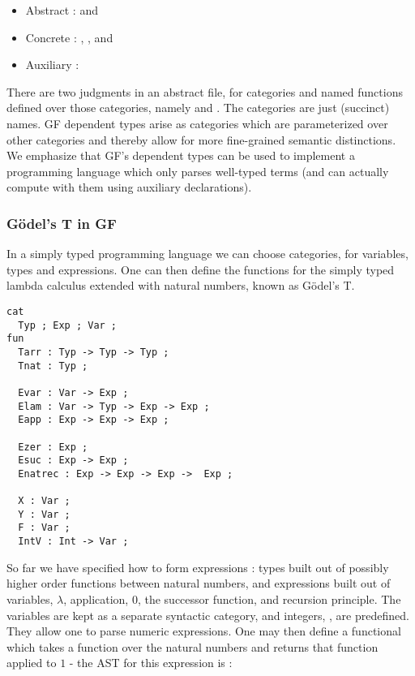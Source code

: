 \begin{itemize}[noitemsep]
  \item Abstract :  and 
  \item Concrete : , , and 
  \item Auxiliary : 
\end{itemize}

There are two judgments in an abstract file, for categories and named functions
defined over those categories, namely  and . The categories
are just (succinct) names. GF dependent types arise as categories which are
parameterized over other categories and thereby allow for more fine-grained
semantic distinctions. We emphasize that GF's dependent types can be used to
implement a programming language which only parses well-typed terms (and can
actually compute with them using auxiliary declarations).

\subsubsection{Gödel's T in GF}

In a simply typed programming language we can choose categories, for variables,
types and expressions. One can then define the functions for the simply typed
lambda calculus extended with natural numbers, known as Gödel's T.

\begin{verbatim} 
cat
  Typ ; Exp ; Var ;
fun
  Tarr : Typ -> Typ -> Typ ;
  Tnat : Typ ;

  Evar : Var -> Exp ;
  Elam : Var -> Typ -> Exp -> Exp ;
  Eapp : Exp -> Exp -> Exp ;

  Ezer : Exp ;
  Esuc : Exp -> Exp ;
  Enatrec : Exp -> Exp -> Exp ->  Exp ;

  X : Var ;
  Y : Var ;
  F : Var ;
  IntV : Int -> Var ;
\end{verbatim}

So far we have specified how to form expressions : types built out of possibly
higher order functions between natural numbers, and expressions built out of
variables, $\lambda$, application, $0$, the successor function, and recursion
principle. The variables are kept as a separate syntactic category, and
integers, , are predefined. They allow one to
parse numeric expressions. One may then define a functional which takes a
function over the natural numbers and returns that function applied to $1$ - the
AST for this expression is :

